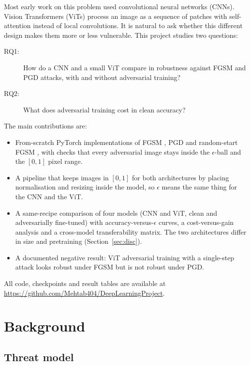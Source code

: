 \documentclass[twoside,a4paper,11pt]{article}
\begin{document}
Most early work on this problem used convolutional neural networks
(CNNs). Vision Transformers (ViTs) \cite{Dosovitskiy:21} process an image
as a sequence of patches with self-attention instead of local
convolutions. It is natural to ask whether this different design makes
them more or less vulnerable. This project studies two questions:

\begin{description}
\item[RQ1:] How do a CNN and a small ViT compare in robustness against
FGSM and PGD attacks, with and without adversarial training?
\item[RQ2:] What does adversarial training cost in clean accuracy?
\end{description}

The main contributions are:

\begin{itemize}
\item From-scratch PyTorch implementations of FGSM \cite{Goodfellow:15},
PGD \cite{Madry:18} and random-start FGSM \cite{Wong:20}, with checks that
every adversarial image stays inside the $\epsilon$-ball and the $[0,1]$
pixel range.
\item A pipeline that keeps images in $[0,1]$ for both architectures by
placing normalisation and resizing inside the model, so $\epsilon$ means
the same thing for the CNN and the ViT.
\item A same-recipe comparison of four models (CNN and ViT, clean and
adversarially fine-tuned) with accuracy-versus-$\epsilon$ curves, a
cost-versus-gain analysis and a cross-model transferability matrix. The
two architectures differ in size and pretraining (Section~\ref{sec:disc}).
\item A documented negative result: ViT adversarial training with a
single-step attack looks robust under FGSM but is not robust under PGD.
\end{itemize}

All code, checkpoints and result tables are available at
\url{https://github.com/Mehtab404/DeepLearningProject}.

\section{Background}

\subsection{Threat model}
\end{document}
